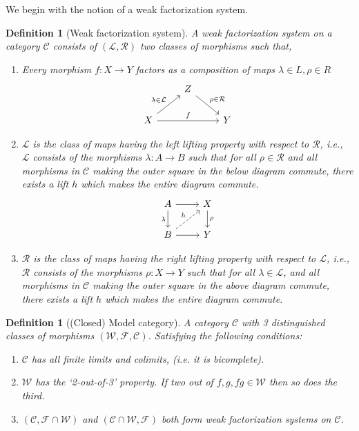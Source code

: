 \documentclass[12pt]{report}
\numberwithin{equation}{section}
\newtheorem{definition}[dummy]{Definition}
\begin{document}
	We begin with the notion of a weak factorization system.
	\begin{definition}[Weak factorization system]
		A weak factorization system on a category $\mathcal{C}$ consists of $(\mathcal{L,R})$ two classes of morphisms such that,
		\begin{enumerate}
			\item Every morphism $f:X \to Y$ factors as a composition of maps $\lambda \in L, \rho \in R $
			\[\begin{tikzcd}
				& Z \\
				X && Y
				\arrow["{\rho \in \mathcal{R}}", from=1-2, to=2-3]
				\arrow["{\lambda \in \mathcal{L}}", from=2-1, to=1-2]
				\arrow["f", from=2-1, to=2-3]
			\end{tikzcd}\]
			\item $\mathcal{L}$ is the class of maps having the left lifting property with respect to $\mathcal{R}$, i.e., $\mathcal{L}$ consists of the morphisms $\lambda :A \to B$ such that for all $\rho \in \mathcal{R}$ and all morphisms in $\mathcal{C}$ making the outer square in the below diagram commute, there exists a lift $h$ which makes the entire diagram commute.
			\[\begin{tikzcd}
				A & X \\
				B & Y
				\arrow[from=1-1, to=1-2]
				\arrow["\lambda"', from=1-1, to=2-1]
				\arrow["\rho", from=1-2, to=2-2]
				\arrow["h", dashed, from=2-1, to=1-2]
				\arrow[from=2-1, to=2-2]
			\end{tikzcd}\]
			
			
			
			\item $\mathcal{R}$ is the class of maps having the right lifting property with respect to $\mathcal{L}$, i.e., $\mathcal{R}$ consists of the morphisms $\rho :X \to Y$ such that for all $\lambda \in \mathcal{L}$, and all morphisms in $\mathcal{C}$ making the outer square in the above diagram commute, there exists a lift $h$ which makes the entire diagram commute.
		\end{enumerate}
	\end{definition}
	
	
	\begin{definition}[(Closed) Model category]
		A category $\mathcal{C}$ with 3 distinguished classes of morphisms $(\mathcal{W, F ,C})$. Satisfying the following conditions:
		\begin{enumerate}
			\item $\mathcal{C}$ has all finite limits and colimits, (i.e. it is bicomplete).
			\item $\mathcal{W}$ has the `2-out-of-3' property. If two out of $f, g, fg \in \mathcal{W}$ then so does the third.
			\item $(\mathcal{C},\mathcal{F}\cap \mathcal{W})$ and $(\mathcal{C}\cap \mathcal{W},\mathcal{F})$ both form weak factorization systems on $\mathcal{C}$.
		\end{enumerate}
	\end{definition}	
		
\end{document}
